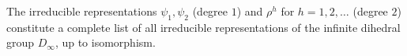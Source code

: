 The irreducible representations $\psi_{1}, \psi_{2}$ (degree $1$) and $\rho^{h}$ for $h = 1, 2, \ldots$ (degree $2$) constitute a complete list of all irreducible representations of the infinite dihedral group $D_{\infty}$, up to isomorphism.
